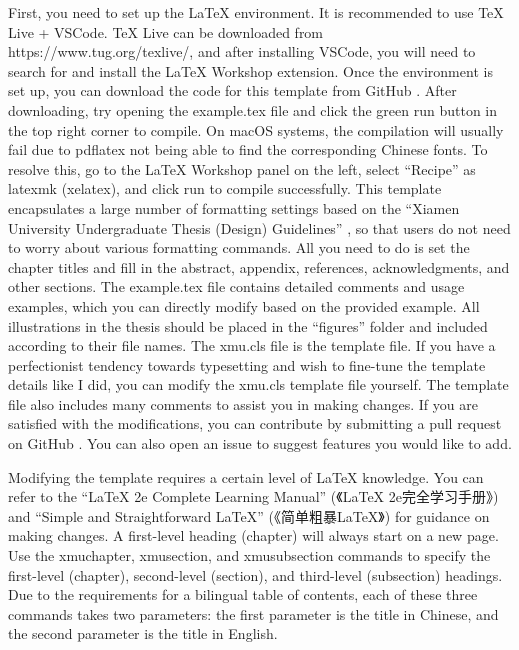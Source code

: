 \documentclass{xmu}
\begin{document}
 \label{ch:Introduction}
 \label{sec:Environment Setup}
First, you need to set up the LaTeX environment. It is recommended to use TeX Live + VSCode. TeX Live can be downloaded from {https://www.tug.org/texlive/}, and after installing VSCode, you will need to search for and install the LaTeX Workshop extension.
Once the environment is set up, you can download the code for this template from GitHub \parencite{template}. After downloading, try opening the example.tex file and click the green run button in the top right corner to compile. On macOS systems, the compilation will usually fail due to pdflatex not being able to find the corresponding Chinese fonts. To resolve this, go to the LaTeX Workshop panel on the left, select ``Recipe'' as latexmk (xelatex), and click run to compile successfully.
This template encapsulates a large number of formatting settings based on the ``Xiamen University Undergraduate Thesis (Design) Guidelines'' \parencite{xmuthesis}, so that users do not need to worry about various formatting commands. All you need to do is set the chapter titles and fill in the abstract, appendix, references, acknowledgments, and other sections.
The example.tex file contains detailed comments and usage examples, which you can directly modify based on the provided example. All illustrations in the thesis should be placed in the ``figures'' folder and included according to their file names.
The xmu.cls file is the template file. If you have a perfectionist tendency towards typesetting and wish to fine-tune the template details like I did, you can modify the xmu.cls template file yourself. The template file also includes many comments to assist you in making changes. If you are satisfied with the modifications, you can contribute by submitting a pull request on GitHub \parencite{template}. You can also open an issue to suggest features you would like to add.
\par
Modifying the template requires a certain level of LaTeX knowledge. You can refer to the ``LaTeX 2e Complete Learning Manual'' (《LaTeX 2e完全学习手册》) \parencite{latex2e} and ``Simple and Straightforward LaTeX'' (《简单粗暴LaTeX》) \parencite{easylatex} for guidance on making changes.
A first-level heading (chapter) will always start on a new page.
Use the xmuchapter, xmusection, and xmusubsection commands to specify the first-level (chapter), second-level (section), and third-level (subsection) headings. Due to the requirements for a bilingual table of contents, each of these three commands takes two parameters: the first parameter is the title in Chinese, and the second parameter is the title in English.
\end{document}
